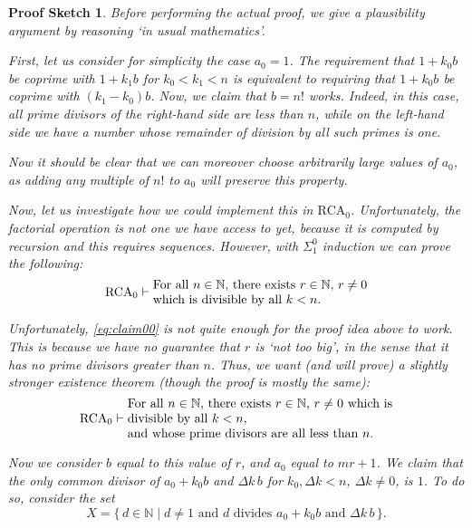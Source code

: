\documentclass{article}
\theoremstyle{nonumberplain}
\newtheorem{sketch}{Proof Sketch}
\newcommand{\N}{\mathbb{N}}
\newcommand{\RCA}{\mathrm{RCA}}
\begin{document}
\begin{sketch}
Before performing the actual proof, we give a plausibility argument by reasoning `in usual mathematics'.

First, let us consider for simplicity the case $a_0 = 1$. The requirement that $1 + k_0 b$ be coprime with $1 + k_1 b$ for $k_0 < k_1 < n$ is equivalent to requiring that $1 + k_0 b$ be coprime with $(k_1 - k_0) b$. Now, we claim that $b = n!$ works. Indeed, in this case, all prime divisors of the right-hand side are less than $n$, while on the left-hand side we have a number whose remainder of division by all such primes is one.

Now it should be clear that we can moreover choose arbitrarily large values of $a_0$, as adding any multiple of $n!$ to $a_0$ will preserve this property.

\smallskip

Now, let us investigate how we could implement this in $\RCA_0$. Unfortunately, the factorial operation is not one we have access to yet, because it is computed by recursion and this requires sequences. However, with $\Sigma^0_1$ induction we can prove the following:
\begin{equation}\label{eq:claim00}
\RCA_0 \vdash \parbox{17em}{For all $n \in \N$, there exists $r \in \N$, $r \neq 0$ which is divisible by all $k < n$.}
\end{equation}

Unfortunately, \eqref{eq:claim00} is not quite enough for the proof idea above to work. This is because we have no guarantee that $r$ is `not too big', in the sense that it has no prime divisors greater than $n$. Thus, we want (and will prove) a slightly stronger existence theorem (though the proof is mostly the same):
\begin{equation}\label{eq:claim01}
\RCA_0 \vdash \parbox{21em}{For all $n \in \N$, there exists $r \in \N$, $r \neq 0$ which is divisible by all $k < n$,\\
and whose prime divisors are all less than $n$.}
\end{equation}

Now we consider $b$ equal to this value of $r$, and $a_0$ equal to $m r + 1$. We claim that the only common divisor of $a_0 + k_0 b$ and $\Delta k \, b$ for $k_0, \Delta k < n$, $\Delta k \neq 0$, is $1$. To do so, consider the set
\begin{equation}
X = \{\, d \in \N \mid \text{$d \neq 1$ and $d$ divides $a_0 + k_0 b$ and $\Delta k \, b$}\,\}.
\end{equation}


\end{sketch}
\end{document}
